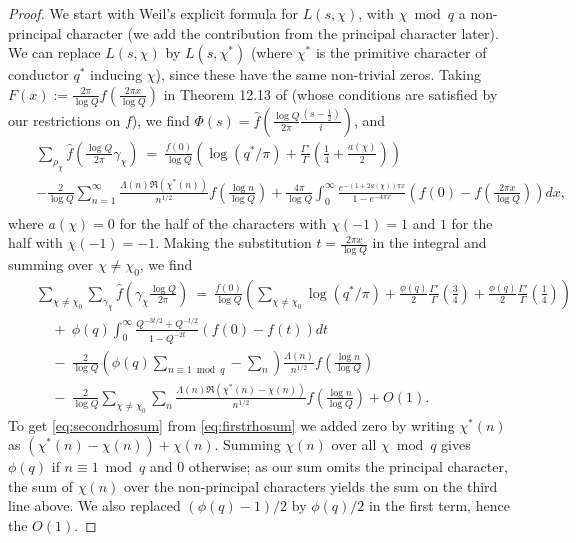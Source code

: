 \documentclass[12pt,reqno]{amsart}
\numberwithin{equation}{section}
\theoremstyle{plain}
\begin{document}
\begin{proof}
We start with Weil's explicit formula for $L(s,\chi)$, with $\chi\bmod q$ a non-principal character (we add the contribution from the principal character later). We can replace $L(s,\chi)$ by $L(s,\chi^*)$ (where $\chi^*$ is the primitive character of conductor $q^*$ inducing $\chi$), since these have the same non-trivial zeros.   Taking $F(x):=\frac{2\pi}{\log Q}f\left(\frac {2\pi x}{\log Q}\right)$ in Theorem 12.13 of \cite{montgomery} (whose conditions are satisfied by our restrictions on $f$), we find $\Phi(s)=\widehat{f}\left( \frac{\log Q}{2\pi} \frac{(s-\frac 12)}i\right)$, and
\begin{eqnarray}\label{eq:firstrhosum} & & \sum_{\rho_{\chi}} \widehat{f}\left( \frac{\log Q}{2\pi} \gamma_{\chi}\right)\ =\ \frac {f(0)}{\log Q}\left( \log(q^*/\pi)+\frac{\Gamma'}{\Gamma}\left(\frac 14+\frac {a(\chi)}2\right)\right) \nonumber\\ & &
-\frac 2{\log Q} \sum_{n=1}^{\infty} \frac{\Lambda(n) \Re(\chi^*(n))}{n^{1/2}}f\left( \frac{\log n}{\log Q}\right)
+\frac{4\pi}{\log Q}\int_0^{\infty} \frac{e^{-(1+2a(\chi))\pi x}}{1-e^{-4\pi x}} \left(f(0)-f\left(\frac{2\pi x}{\log Q}\right)\right)dx, \nonumber\\
\end{eqnarray} where $a(\chi) = 0$ for the half of the characters with $\chi(-1) = 1$ and $1$ for the half with $\chi(-1) = -1$. Making the substitution $t=\frac{2\pi x}{\log Q}$ in the integral and summing over $\chi\neq \chi_0$, we find
\begin{eqnarray}\label{eq:secondrhosum}& & \sum_{\chi \neq \chi_0} \sum_{\gamma_{\chi}} \widehat{f}\left(
\gamma_{\chi} \frac{\log Q}{2\pi} \right) \  = \  \frac {f(0)}{\log Q}\left( \sum_{\chi\neq \chi_0} \log(q^*/\pi)+\frac{\phi(q)}{2}\frac{\Gamma'}{\Gamma}\left(\frac 34\right)+\frac{\phi(q)}{2}\frac{\Gamma'}{\Gamma}\left(\frac 14\right)\right) \nonumber\\
& & \ \ \ \ \ + \  \phi(q)\int_0^{\infty}\frac{Q^{-3t/2}+Q^{-t/2}}{1-Q^{-2t}}(f(0)-f(t))dt \nonumber\\
& & \ \ \ \ \ - \ \frac 2{\log Q} \left(\phi(q)\sum_{n\equiv 1 \bmod q} - \sum_n \right) \frac{\Lambda(n)}{n^{1/2}}f\left( \frac{\log n}{\log Q}\right) \nonumber\\
& & \ \ \ \ \  - \ \frac 2{\log Q} \sum_{\chi \neq \chi_0} \sum_{n} \frac{\Lambda(n) \Re(\chi^*(n)-\chi(n))}{n^{1/2}}f\left( \frac{\log n}{\log Q}\right) +O\left(1\right).
\end{eqnarray} To get \eqref{eq:secondrhosum} from \eqref{eq:firstrhosum} we added zero by writing $\chi^*(n)$ as $\left(\chi^*(n) - \chi(n)\right) + \chi(n)$. Summing $\chi(n)$ over all $\chi \bmod q$ gives $\phi(q)$ if $n \equiv 1 \bmod q$ and $0$ otherwise; as our sum omits the principal character, the sum of $\chi(n)$ over the non-principal characters yields the sum on the third line above. We also replaced $(\phi(q)-1)/2$ by $\phi(q)/2$ in the first term, hence the $O(1)$.


\end{proof}
\end{document}
